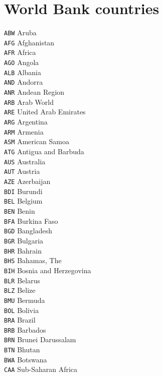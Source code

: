 \chapter{World Bank countries}\label{chap_countries}


\begin{multicols}{3}
\scriptsize{
\noindent \texttt{ABW}	Aruba\\
\texttt{AFG}	Afghanistan\\
\texttt{AFR}	Africa\\
\texttt{AGO}	Angola\\
\texttt{ALB}	Albania\\
\texttt{AND}	Andorra\\
\texttt{ANR}	Andean Region\\
\texttt{ARB}	Arab World\\
\texttt{ARE}	United Arab Emirates\\
\texttt{ARG}	Argentina\\
\texttt{ARM}	Armenia\\
\texttt{ASM}	American Samoa\\
\texttt{ATG}	Antigua and Barbuda\\
\texttt{AUS}	Australia\\
\texttt{AUT}	Austria\\
\texttt{AZE}	Azerbaijan\\
\texttt{BDI}	Burundi\\
\texttt{BEL}	Belgium\\
\texttt{BEN}	Benin\\
\texttt{BFA}	Burkina Faso\\
\texttt{BGD}	Bangladesh\\
\texttt{BGR}	Bulgaria\\
\texttt{BHR}	Bahrain\\
\texttt{BHS}	Bahamas, The\\
\texttt{BIH}	Bosnia and Herzegovina\\
\texttt{BLR}	Belarus\\
\texttt{BLZ}	Belize\\
\texttt{BMU}	Bermuda\\
\texttt{BOL}	Bolivia\\
\texttt{BRA}	Brazil\\
\texttt{BRB}	Barbados\\
\texttt{BRN}	Brunei Darussalam\\
\texttt{BTN}	Bhutan\\
\texttt{BWA}	Botswana\\
\texttt{CAA}	Sub-Saharan Africa\\
}
\end{multicols}
